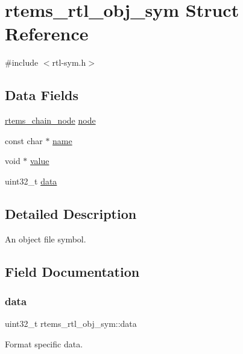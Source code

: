 \hypertarget{structrtems__rtl__obj__sym}{}\section{rtems\+\_\+rtl\+\_\+obj\+\_\+sym Struct Reference}
\label{structrtems__rtl__obj__sym}


{\ttfamily \#include $<$rtl-\/sym.\+h$>$}

\subsection*{Data Fields}
\begin{DoxyCompactItemize}
\item 
\mbox{\hyperlink{structChain__Node__struct}{rtems\+\_\+chain\+\_\+node}} \mbox{\hyperlink{structrtems__rtl__obj__sym_a7a7b0fe458c7c27ade5d67b1ca317eee}{node}}
\item 
const char $\ast$ \mbox{\hyperlink{structrtems__rtl__obj__sym_a72800e506f43219a171afc88c6f54b68}{name}}
\item 
void $\ast$ \mbox{\hyperlink{structrtems__rtl__obj__sym_ab5237d93c4e94f0949e96500126d0332}{value}}
\item 
uint32\+\_\+t \mbox{\hyperlink{structrtems__rtl__obj__sym_a970a652e661bdab51a7888f3145dba81}{data}}
\end{DoxyCompactItemize}


\subsection{Detailed Description}
An object file symbol. 

\subsection{Field Documentation}
\mbox{\label{structrtems__rtl__obj__sym_a970a652e661bdab51a7888f3145dba81}} 
\subsubsection{\texorpdfstring{data}{data}}
{\footnotesize\ttfamily uint32\+\_\+t rtems\+\_\+rtl\+\_\+obj\+\_\+sym\+::data}

Format specific data. \mbox{\label{structrtems__rtl__obj__sym_a72800e506f43219a171afc88c6f54b68}} 
